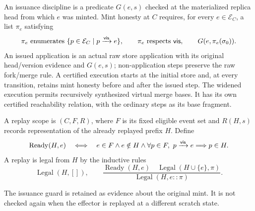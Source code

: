 \begin{definition}
\label{def:issuance}
An issuance discipline is a predicate $G(e,s)$ checked at the materialized
replica head from which $e$ was minted. Mint honesty at $C$ requires, for every
$e\in\mathcal E_C$, a list $\pi_e$ satisfying
\[
 \pi_e\text{ enumerates }\{p\in\mathcal E_C\mid p\mathrel{\xrightarrow{\mathsf{vis}}} e\},\qquad
 \pi_e\text{ respects }\mathsf{vis},\qquad G(e,\pi_e(\sigma_0)).
\]
An issued application is an actual raw store application with its original
head/version evidence and $G(e,s)$; non-application steps preserve the raw
fork/merge rule. A certified execution starts at the initial store and, at
every transition, retains mint honesty before and after the issued step.
The widened execution permits recursively synthesized virtual merge bases.
It has its own certified reachability relation, with the ordinary steps as its
base fragment.

A replay scope is $(C,F,R)$, where $F$ is its fixed eligible event set and
$R(H,s)$ records representation of the already replayed prefix $H$. Define
\[
 \operatorname{Ready}(H,e)\quad\Longleftrightarrow\quad
 e\in F\land e\notin H\land
 \forall p\in F,\ p\mathrel{\xrightarrow{\mathsf{vis}}} e\Longrightarrow p\in H.
\]
A replay is legal from $H$ by the inductive rules
\[
 \operatorname{Legal}(H,[]),\qquad
 \frac{\operatorname{Ready}(H,e)\quad
       \operatorname{Legal}(H\cup\{e\},\pi)}
      {\operatorname{Legal}(H,e::\pi)}.
\]
\end{definition}
The issuance guard is retained as evidence about the original mint. It is not
checked again when the effector is replayed at a different scratch state.

